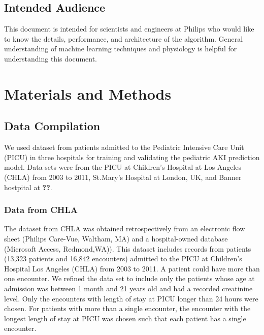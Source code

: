 \documentclass[
   technote
]{phildoc}
\begin{document}
\section{Intended Audience}
This document is intended for scientists and engineers at Philips who would like to know the details, performance, and architecture of the algorithm. General understanding of machine learning techniques and physiology is helpful for understanding this document. 



\chapter{Materials and Methods}
\label{methods}
\section{Data Compilation}
\label{sec:data_compilation}
We used dataset from patients admitted to the Pediatric Intensive Care Unit (PICU) in three hospitals for training and validating the pediatric AKI prediction model. Data sets were from the PICU at Children's Hospital at Los Angeles (CHLA) from 2003 to 2011, St.Mary's Hospital at London, UK, and Banner hostpital at \textbf{??}. 


\subsection{Data from CHLA}
The dataset from CHLA was obtained retrospectively from an electronic flow sheet (Philips Care-Vue, Waltham, MA) and a hospital-owned database (Microsoft Access, Redmond,WA)). This dataset includes records from patients (13,323 patients and 16,842 encounters) admitted to the PICU at Children’s Hospital Los Angeles (CHLA) from 2003 to 2011. A patient could have more than one encounter. We refined the data set to include only the patients whose age at admission was between 1 month and 21 years old and had a recorded creatinine level. Only the encounters with length of stay at PICU longer than 24 hours were chosen. For patients with more than a single encounter, the encounter with the longest length of stay at PICU was chosen such that each patient has a single encounter. 
\end{document}
